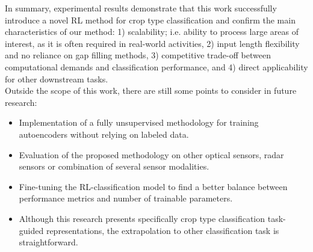 \documentclass[journal,article,submit,pdftex,moreauthors]{Definitions/mdpi}
\begin{document}
In summary, experimental results demonstrate that this work successfully introduce a novel \ac{RL} method for crop type classification and confirm the main characteristics of our method: 1) scalability; i.e. ability to process large areas of interest, as it is often required in real-world activities, 2) input length flexibility and no reliance on gap filling methods, 3) competitive trade-off between computational demands and classification performance, and 4) direct applicability for other downstream tasks.\\


Outside the scope of this work, there are still some points to consider in future research:
\begin{itemize}
	\item Implementation of a fully unsupervised methodology for training autoencoders without relying on labeled data.
	\item Evaluation of the proposed methodology on other optical sensors, radar sensors or combination of several sensor modalities.
	\item Fine-tuning the RL-classification model to find a better balance between performance metrics and number of trainable parameters.
    \item Although this research presents specifically crop type classification task-guided representations, the extrapolation to other classification task is straightforward.
\end{itemize}

\end{document}

